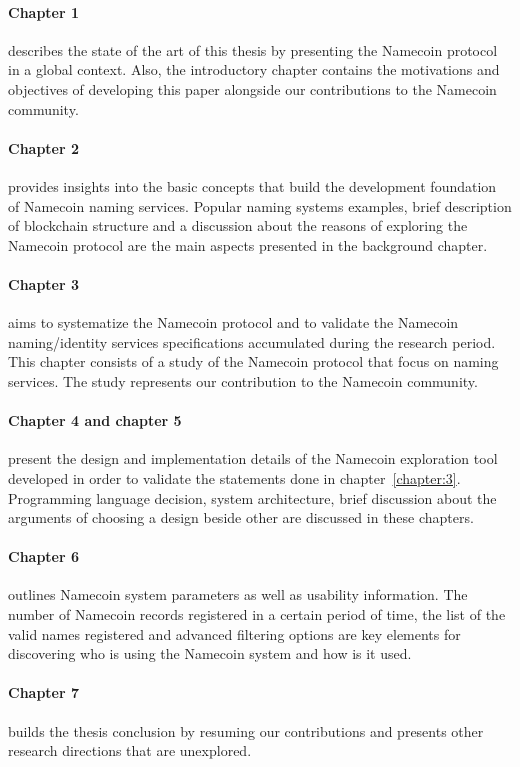 \paragraph{ Chapter 1} describes the state of the art of this thesis by presenting the Namecoin protocol in a global context. Also, the introductory chapter contains the motivations and objectives of developing this paper alongside our contributions to the Namecoin community.
\paragraph{ Chapter 2} provides insights into the basic concepts that build the development foundation of Namecoin naming services. Popular naming systems examples, brief description of blockchain structure and a discussion about the reasons of exploring the Namecoin protocol are the main aspects presented in the background chapter.
\paragraph{ Chapter 3} aims to systematize the Namecoin protocol and to validate the Namecoin naming/identity services specifications accumulated during the research period. This chapter consists of a study of the Namecoin protocol that focus on naming services. The study represents our contribution to the Namecoin community.
\paragraph{ Chapter 4 and chapter 5} present the design and implementation details of the Namecoin exploration tool developed in order to validate the statements done in chapter~\ref{chapter:3}. Programming language decision, system architecture, brief discussion about the arguments of choosing a design beside other are discussed in these chapters.
\paragraph{ Chapter 6} outlines Namecoin system parameters as well as usability information. The number of Namecoin records registered in a certain period of time, the list of the valid names registered and advanced filtering options are key elements for discovering who is using the Namecoin system and how is it used.
\paragraph{ Chapter 7} builds the thesis conclusion by resuming our contributions and presents other research directions that are unexplored.

